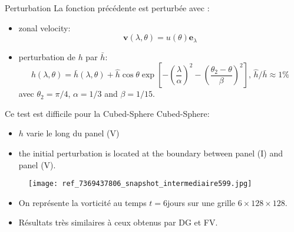 \documentclass[11pt]{beamer}
\begin{document}
\begin{frame}{}
\begin{exampleblock}{Perturbation}
La fonction précédente est perturbée avec :
\begin{itemize}
\item zonal velocity:
$$\mathbf{v}(\lambda,\theta) = u(\theta) \mathbf{e}_{\lambda}$$
\item perturbation de $h$ par $\bar{h}$:
$$h(\lambda,\theta) = \bar{h}(\lambda,\theta) + \hat{h} \cos \theta \exp \left[ - \left( \dfrac{\lambda}{\alpha} \right)^2 - \left( \dfrac{\theta_2 - \theta}{\beta} \right)^2 \right] \text{, } \hat{h}/\bar{h} \approx 1 \%$$
avec $\theta_2 = \pi/4$, $\alpha = 1/3$ and $\beta = 1/15$.
\end{itemize}
\end{exampleblock}

\begin{block}{}
Ce test est difficile pour la Cubed-Sphere Cubed-Sphere:

\begin{itemize}
\item $h$ varie le long du panel (V)
\item the initial perturbation is located at the boundary between panel (I) and panel (V).
\end{itemize}
\end{block}
\end{frame}


\begin{frame}{}
\begin{figure}
\texttt{[image: ref\_7369437806\_snapshot\_intermediaire599.jpg]}
\end{figure}
\begin{itemize}
\item On représente la vorticité au temps $t=6$jours sur une grille $6 \times 128 \times 128$.
\item Résultats très similaires à ceux obtenus par DG et FV.
\end{itemize}
\end{frame}

\end{document}
